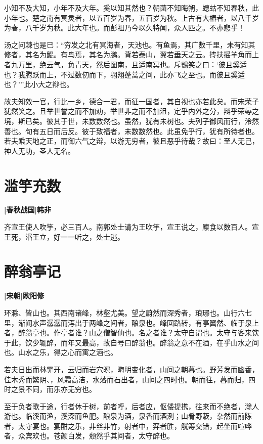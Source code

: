 \documentclass[UTF8,titlepage,oneside]{ctexbook}
\begin{document}
小知不及大知，小年不及大年。奚以知其然也？朝菌不知晦朔，蟪蛄不知春秋，此小年也。楚之南有冥灵者，以五百岁为春，五百岁为秋。上古有大椿者，以八千岁为春，八千岁为秋。此大年也。而彭祖乃今以久特闻，众人匹之。不亦悲乎！

汤之问棘也是已：“穷发之北有冥海者，天池也。有鱼焉，其广数千里，未有知其修者，其名为鲲。有鸟焉，其名为鹏。背若泰山，翼若垂天之云。抟扶摇羊角而上者九万里，绝云气，负青天，然后图南，且适南冥也。斥鷃笑之曰：‘彼且奚适也？我腾跃而上，不过数仞而下，翱翔蓬蒿之间，此亦飞之至也。而彼且奚适也？’”此小大之辩也。

故夫知效一官，行比一乡，德合一君，而征一国者，其自视也亦若此矣。而宋荣子犹然笑之。且举世誉之而不加劝，举世非之而不加沮，定乎内外之分，辩乎荣辱之境，斯已矣。彼其于世，未数数然也。虽然，犹有未树也。夫列子御风而行，泠然善也。旬有五日而后反。彼于致福者，未数数然也。此虽免乎行，犹有所待者也。若夫乘天地之正，而御六气之辩，以游无穷者，彼且恶乎待哉？故曰：至人无己，神人无功，圣人无名。


\chapter*{滥竽充数}
\begin{center}
	\textbf{[春秋战国]韩非}
\end{center}

齐宣王使人吹竽，必三百人。南郭处士请为王吹竽，宣王说之，廪食以数百人。宣王死，湣王立，好一一听之，处士逃。


\chapter*{醉翁亭记}
\begin{center}
	\textbf{[宋朝]欧阳修}
\end{center}

环滁、皆山也。其西南诸峰，林壑尤美。望之蔚然而深秀者，琅琊也。山行六七里，渐闻水声潺潺而泻出于两峰之间者，酿泉也。峰回路转，有亭翼然、临于泉上者，醉翁亭也。作亭者谁？山之僧智仙也。名之者谁？太守自谓也。太守与客来饮于此，饮少辄醉，而年又最高，故自号曰醉翁也。醉翁之意不在酒，在乎山水之间也。山水之乐，得之心而寓之酒也。


若夫日出而林霏开，云归而岩穴暝，晦明变化者，山间之朝暮也。野芳发而幽香，佳木秀而繁阴、，风霜高洁，水落而石出者，山间之四时也。朝而往，暮而归，四时之景不同，而乐亦无穷也。


至于负者歌于途，行者休于树，前者呼，后者应，伛偻提携，往来而不绝者，滁人游也。临溪而渔，溪深而鱼肥。酿泉为酒，泉香而酒洌；山肴野蔌，杂然而前陈者，太守宴也。宴酣之乐，非丝非竹，射者中，弈者胜，觥筹交错，起坐而喧哗者，众宾欢也。苍颜白发，颓然乎其间者，太守醉也。
\end{document}
